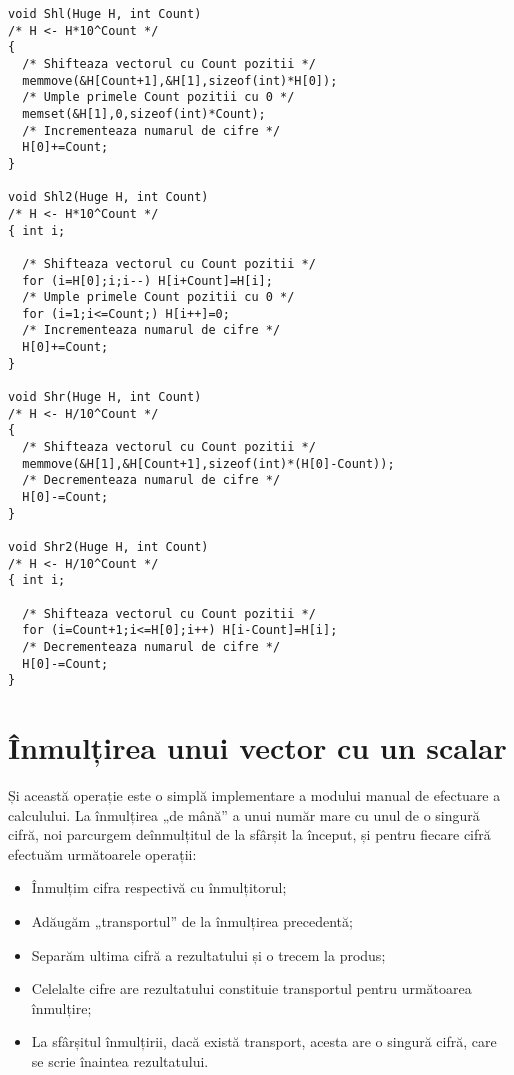\begin{verbatim}
void Shl(Huge H, int Count)
/* H <- H*10^Count */
{ 
  /* Shifteaza vectorul cu Count pozitii */
  memmove(&H[Count+1],&H[1],sizeof(int)*H[0]);
  /* Umple primele Count pozitii cu 0 */
  memset(&H[1],0,sizeof(int)*Count);
  /* Incrementeaza numarul de cifre */
  H[0]+=Count;
}

void Shl2(Huge H, int Count)
/* H <- H*10^Count */
{ int i;

  /* Shifteaza vectorul cu Count pozitii */
  for (i=H[0];i;i--) H[i+Count]=H[i];
  /* Umple primele Count pozitii cu 0 */
  for (i=1;i<=Count;) H[i++]=0;
  /* Incrementeaza numarul de cifre */
  H[0]+=Count;
}

void Shr(Huge H, int Count)
/* H <- H/10^Count */
{ 
  /* Shifteaza vectorul cu Count pozitii */
  memmove(&H[1],&H[Count+1],sizeof(int)*(H[0]-Count));
  /* Decrementeaza numarul de cifre */
  H[0]-=Count;
}

void Shr2(Huge H, int Count)
/* H <- H/10^Count */
{ int i;

  /* Shifteaza vectorul cu Count pozitii */
  for (i=Count+1;i<=H[0];i++) H[i-Count]=H[i];
  /* Decrementeaza numarul de cifre */
  H[0]-=Count;
}
\end{verbatim}

\section{Înmulțirea unui vector cu un scalar}

Și această operație este o simplă implementare a modului manual de efectuare a
calculului. La înmulțirea „de mână” a unui număr mare cu unul de o singură
cifră, noi parcurgem deînmulțitul de la sfârșit la început, și pentru fiecare
cifră efectuăm următoarele operații:

\begin{itemize}

\item Înmulțim cifra respectivă cu înmulțitorul;

\item Adăugăm „transportul” de la înmulțirea precedentă;

\item Separăm ultima cifră a rezultatului și o trecem la produs;

\item Celelalte cifre are rezultatului constituie transportul pentru
  următoarea înmulțire;

\item La sfârșitul înmulțirii, dacă există transport, acesta are o singură
  cifră, care se scrie înaintea rezultatului.

\end{itemize}

